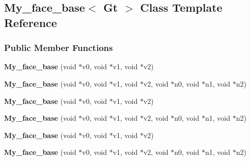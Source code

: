 \hypertarget{classMy__face__base}{\subsection{\-My\-\_\-face\-\_\-base$<$ \-Gt $>$ \-Class \-Template \-Reference}
\label{classMy__face__base}
}
\subsubsection*{\-Public \-Member \-Functions}
\begin{DoxyCompactItemize}
\item 
\hypertarget{classMy__face__base_a0af70fd60f0aed9b024b89ea6a81d301}{{\bfseries \-My\-\_\-face\-\_\-base} (void $\ast$v0, void $\ast$v1, void $\ast$v2)}\label{classMy__face__base_a0af70fd60f0aed9b024b89ea6a81d301}

\item 
\hypertarget{classMy__face__base_aec3abe8ca3bec335a5d865fa8c7fe8f3}{{\bfseries \-My\-\_\-face\-\_\-base} (void $\ast$v0, void $\ast$v1, void $\ast$v2, void $\ast$n0, void $\ast$n1, void $\ast$n2)}\label{classMy__face__base_aec3abe8ca3bec335a5d865fa8c7fe8f3}

\item 
\hypertarget{classMy__face__base_a0af70fd60f0aed9b024b89ea6a81d301}{{\bfseries \-My\-\_\-face\-\_\-base} (void $\ast$v0, void $\ast$v1, void $\ast$v2)}\label{classMy__face__base_a0af70fd60f0aed9b024b89ea6a81d301}

\item 
\hypertarget{classMy__face__base_aec3abe8ca3bec335a5d865fa8c7fe8f3}{{\bfseries \-My\-\_\-face\-\_\-base} (void $\ast$v0, void $\ast$v1, void $\ast$v2, void $\ast$n0, void $\ast$n1, void $\ast$n2)}\label{classMy__face__base_aec3abe8ca3bec335a5d865fa8c7fe8f3}

\item 
\hypertarget{classMy__face__base_a0af70fd60f0aed9b024b89ea6a81d301}{{\bfseries \-My\-\_\-face\-\_\-base} (void $\ast$v0, void $\ast$v1, void $\ast$v2)}\label{classMy__face__base_a0af70fd60f0aed9b024b89ea6a81d301}

\item 
\hypertarget{classMy__face__base_aec3abe8ca3bec335a5d865fa8c7fe8f3}{{\bfseries \-My\-\_\-face\-\_\-base} (void $\ast$v0, void $\ast$v1, void $\ast$v2, void $\ast$n0, void $\ast$n1, void $\ast$n2)}\label{classMy__face__base_aec3abe8ca3bec335a5d865fa8c7fe8f3}

\end{DoxyCompactItemize}
